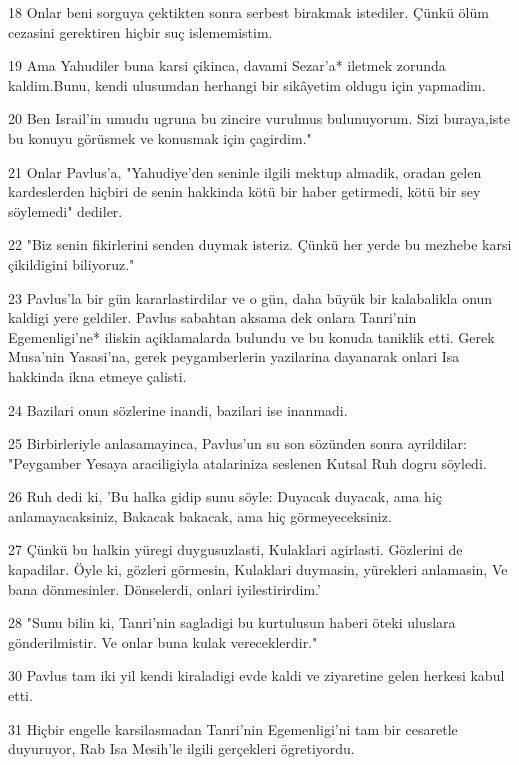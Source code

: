 \par 18 Onlar beni sorguya çektikten sonra serbest birakmak istediler. Çünkü ölüm cezasini gerektiren hiçbir suç islememistim.
\par 19 Ama Yahudiler buna karsi çikinca, davami Sezar'a* iletmek zorunda kaldim.Bunu, kendi ulusumdan herhangi bir sikâyetim oldugu için yapmadim.
\par 20 Ben Israil'in umudu ugruna bu zincire vurulmus bulunuyorum. Sizi buraya,iste bu konuyu görüsmek ve konusmak için çagirdim."
\par 21 Onlar Pavlus'a, "Yahudiye'den seninle ilgili mektup almadik, oradan gelen kardeslerden hiçbiri de senin hakkinda kötü bir haber getirmedi, kötü bir sey söylemedi" dediler.
\par 22 "Biz senin fikirlerini senden duymak isteriz. Çünkü her yerde bu mezhebe karsi çikildigini biliyoruz."
\par 23 Pavlus'la bir gün kararlastirdilar ve o gün, daha büyük bir kalabalikla onun kaldigi yere geldiler. Pavlus sabahtan aksama dek onlara Tanri'nin Egemenligi'ne* iliskin açiklamalarda bulundu ve bu konuda taniklik etti. Gerek Musa'nin Yasasi'na, gerek peygamberlerin yazilarina dayanarak onlari Isa hakkinda ikna etmeye çalisti.
\par 24 Bazilari onun sözlerine inandi, bazilari ise inanmadi.
\par 25 Birbirleriyle anlasamayinca, Pavlus'un su son sözünden sonra ayrildilar: "Peygamber Yesaya araciligiyla atalariniza seslenen Kutsal Ruh dogru söyledi.
\par 26 Ruh dedi ki, 'Bu halka gidip sunu söyle: Duyacak duyacak, ama hiç anlamayacaksiniz, Bakacak bakacak, ama hiç görmeyeceksiniz.
\par 27 Çünkü bu halkin yüregi duygusuzlasti, Kulaklari agirlasti. Gözlerini de kapadilar. Öyle ki, gözleri görmesin, Kulaklari duymasin, yürekleri anlamasin, Ve bana dönmesinler. Dönselerdi, onlari iyilestirirdim.'
\par 28 "Sunu bilin ki, Tanri'nin sagladigi bu kurtulusun haberi öteki uluslara gönderilmistir. Ve onlar buna kulak vereceklerdir."
\par 30 Pavlus tam iki yil kendi kiraladigi evde kaldi ve ziyaretine gelen herkesi kabul etti.
\par 31 Hiçbir engelle karsilasmadan Tanri'nin Egemenligi'ni tam bir cesaretle duyuruyor, Rab Isa Mesih'le ilgili gerçekleri ögretiyordu.



